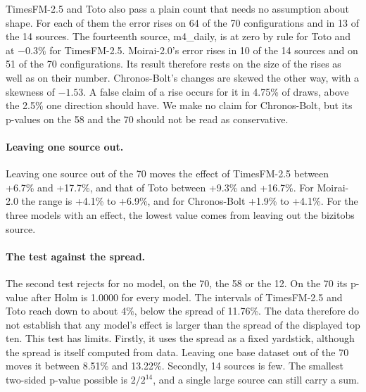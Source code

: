 \documentclass{article}
\begin{document}
TimesFM-2.5 and Toto also pass a plain count that needs no assumption about shape. For each of
them the error rises on 64 of the 70 configurations and in 13 of the 14 sources. The
fourteenth source, m4\_daily, is at zero by rule for Toto and at $-0.3\%$ for TimesFM-2.5.
Moirai-2.0's error rises in 10 of the 14 sources and on 51 of the 70 configurations. Its result
therefore rests on the size of the rises as well as on their number. Chronos-Bolt's changes
are skewed the other way, with a skewness of $-1.53$. A false claim of a rise occurs for it in
4.75\% of draws, above the 2.5\% one direction should have. We make no claim for Chronos-Bolt,
but its p-values on the 58 and the 70 should not be read as conservative.

\paragraph{Leaving one source out.} Leaving one source out of the 70 moves the effect of
TimesFM-2.5 between +6.7\% and +17.7\%, and that of Toto between +9.3\% and +16.7\%. For
Moirai-2.0 the range is +4.1\% to +6.9\%, and for Chronos-Bolt +1.9\% to +4.1\%. For the three
models with an effect, the lowest value comes from leaving out the bizitobs source.

\paragraph{The test against the spread.} The second test rejects for no model, on the 70, the
58 or the 12. On the 70 its p-value after Holm is 1.0000 for every model. The intervals of
TimesFM-2.5 and Toto reach down to about 4\%, below the spread of 11.76\%. The data therefore
do not establish that any model's effect is larger than the spread of the displayed top ten.
This test has limits. Firstly, it uses the spread as a fixed yardstick, although the spread
is itself computed from data. Leaving one base dataset out of the 70 moves it between 8.51\%
and 13.22\%. Secondly, 14 sources is few. The smallest two-sided p-value possible is
$2/2^{14}$, and a single large source can still carry a sum.
\end{document}
